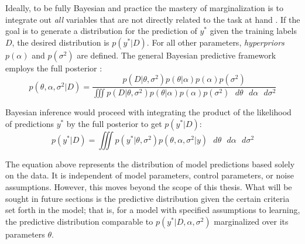 
Ideally, to be fully Bayesian and practice the mastery of marginalization is to integrate out \textit{all} variables that are not directly related to the task at hand \cite{bishop2006pattern}.  If the goal is to generate a distribution for the prediction of $y^*$ given the training labels $D$, the desired distribution is $p(y^*|D)$.  For all other parameters, \textit{hyperpriors} $p(\alpha)$ and $p(\sigma^2)$ are defined. The general Bayesian predictive framework employs the full posterior \cite{tipping2004bayesian}:
$$
p(\theta,\alpha,\sigma^2|D) = \frac{p(D|\theta,\sigma^2) p(\theta|\alpha)p(\alpha)p(\sigma^2)}
{\iiint p(D|\theta,\sigma^2)p(\theta|\alpha)p(\alpha)p(\sigma^2) \text{ } d\theta \text{ } d\alpha \text{ } d\sigma^2}
$$

Bayesian inference would proceed with integrating the product of the likelihood of predictions $y^*$ by the full posterior to get $p(y^*|D)$:
$$
p(y^*|D) = \iiint p(y^*|\theta,\sigma^2) p(\theta,\alpha,\sigma^2|y)
\text{ } d\theta \text{ } d\alpha \text{ } d\sigma^2
$$

The equation above represents the distribution of model predictions based solely on the data.  It is independent of model parameters, control parameters, or noise assumptions.  However, this moves beyond the scope of this thesis.  What will be sought in future sections is the predictive distribution given the certain criteria set forth in the model; that is, for a model with specified assumptions to learning, the predictive distribution comparable to $p(y^*|D,\alpha,\sigma^2)$ marginalized over its parameters $\theta$.



\begin{comment}
\subsection{Predictive Accuracy Measures}
I feel I need to put Bayes-CV somewhere...

Mention of their frequentist analog (for lppd is is the log-probability score on Rethinking p. 214)

\textbf{Bayesian Cross-Validation} to get the log-pointwise predictive density
$$
lppd_{CV} = \sum_{i=1}^N \frac{1}{S} \sum_{s=1}^S logP(w_i|\theta_{-i,s})
$$

\textbf{Information Criteria} also found in Rethinking (p. 223) and BDA (p. 169)
\end{comment}


